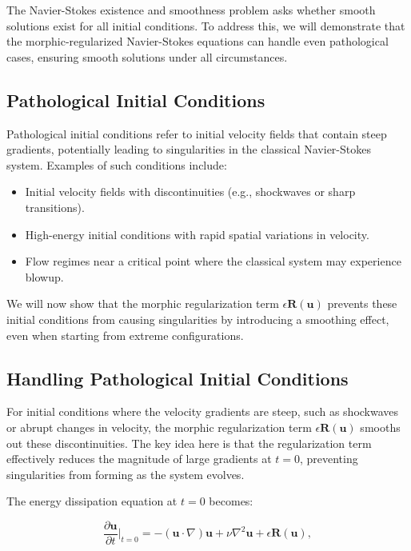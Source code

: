 \documentclass{article}
\begin{document}
The Navier-Stokes existence and smoothness problem asks whether smooth solutions exist for all initial conditions. To address this, we will demonstrate that the morphic-regularized Navier-Stokes equations can handle even pathological cases, ensuring smooth solutions under all circumstances.

\subsection*{Pathological Initial Conditions}

Pathological initial conditions refer to initial velocity fields that contain steep gradients, potentially leading to singularities in the classical Navier-Stokes system. Examples of such conditions include:
\begin{itemize}
    \item Initial velocity fields with discontinuities (e.g., shockwaves or sharp transitions).
    \item High-energy initial conditions with rapid spatial variations in velocity.
    \item Flow regimes near a critical point where the classical system may experience blowup.
\end{itemize}

We will now show that the morphic regularization term \( \epsilon \mathbf{R}(\mathbf{u}) \) prevents these initial conditions from causing singularities by introducing a smoothing effect, even when starting from extreme configurations.

\subsection*{Handling Pathological Initial Conditions}

For initial conditions where the velocity gradients are steep, such as shockwaves or abrupt changes in velocity, the morphic regularization term \( \epsilon \mathbf{R}(\mathbf{u}) \) smooths out these discontinuities. The key idea here is that the regularization term effectively reduces the magnitude of large gradients at \( t = 0 \), preventing singularities from forming as the system evolves.

The energy dissipation equation at \( t = 0 \) becomes:

\[
\frac{\partial \mathbf{u}}{\partial t} \Big|_{t=0} = - (\mathbf{u} \cdot \nabla)\mathbf{u} + \nu \nabla^2 \mathbf{u} + \epsilon \mathbf{R}(\mathbf{u}),
\]
\end{document}
